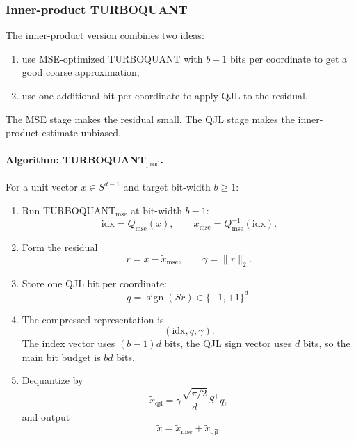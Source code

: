 \subsubsection*{Inner-product TURBOQUANT}

The inner-product version combines two ideas:
\begin{enumerate}[leftmargin=2em]
    \item use MSE-optimized TURBOQUANT with $b-1$ bits per coordinate to get a good coarse approximation;
    \item use one additional bit per coordinate to apply QJL to the residual.
\end{enumerate}
The MSE stage makes the residual small.
The QJL stage makes the inner-product estimate unbiased.

\paragraph{Algorithm: \textsc{TURBOQUANT}$_{\mathrm{prod}}$.}
For a unit vector $x\in S^{d-1}$ and target bit-width $b\ge 1$:
\begin{enumerate}[leftmargin=2em]
    \item Run \textsc{TURBOQUANT}$_{\mathrm{mse}}$ at bit-width $b-1$:
    \[
        \mathrm{idx}=Q_{\mathrm{mse}}(x),
        \qquad
        \widetilde x_{\mathrm{mse}}=Q_{\mathrm{mse}}^{-1}(\mathrm{idx}).
    \]
    \item Form the residual
    \[
        r=x-\widetilde x_{\mathrm{mse}},
        \qquad
        \gamma=\|r\|_2.
    \]
    \item Store one QJL bit per coordinate:
    \[
        q=\operatorname{sign}(Sr)\in\{-1,+1\}^{d}.
    \]
    \item The compressed representation is
    \[
        (\mathrm{idx},q,\gamma).
    \]
    The index vector uses $(b-1)d$ bits, the QJL sign vector uses $d$ bits, so the main bit budget is $bd$ bits.
    \item Dequantize by
    \[
        \widetilde x_{\mathrm{qjl}}
        =\gamma\frac{\sqrt{\pi/2}}{d}S^\top q,
    \]
    and output
    \[
        \widetilde x=\widetilde x_{\mathrm{mse}}+\widetilde x_{\mathrm{qjl}}.
    \]
\end{enumerate}

